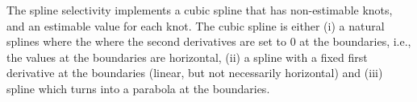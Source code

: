 \subsubsection[Spline]{}

The spline selectivity implements a cubic spline that has non-estimable knots, and an estimable value for each knot. The cubic spline is either (i) a natural splines where the where the second derivatives are set to 0 at the boundaries, i.e., the values at the boundaries are horizontal, (ii) a spline with a fixed first derivative at the boundaries (linear, but not necessarily horizontal) and (iii) spline which turns into a parabola at the boundaries.







